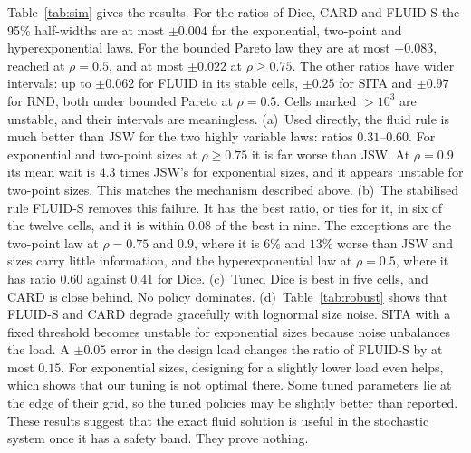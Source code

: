 Table~\ref{tab:sim} gives the results. For the ratios of Dice, CARD and FLUID-S the 95\% half-widths are at most $\pm0.004$ for the exponential, two-point and hyperexponential laws. For the bounded Pareto law they are at most $\pm0.083$, reached at $\rho=0.5$, and at most $\pm0.022$ at $\rho\ge0.75$. The other ratios have wider intervals: up to $\pm0.062$ for FLUID in its stable cells, $\pm0.25$ for SITA and $\pm0.97$ for RND, both under bounded Pareto at $\rho=0.5$. Cells marked $>10^3$ are unstable, and their intervals are meaningless.
(a)~Used directly, the fluid rule is much better than JSW for the two highly variable laws: ratios $0.31$--$0.60$. For exponential and two-point sizes at $\rho\ge0.75$ it is far worse than JSW. At $\rho=0.9$ its mean wait is $4.3$ times JSW's for exponential sizes, and it appears unstable for two-point sizes. This matches the mechanism described above.
(b)~The stabilised rule FLUID-S removes this failure. It has the best ratio, or ties for it, in six of the twelve cells, and it is within $0.08$ of the best in nine. The exceptions are the two-point law at $\rho=0.75$ and $0.9$, where it is $6\%$ and $13\%$ worse than JSW and sizes carry little information, and the hyperexponential law at $\rho=0.5$, where it has ratio $0.60$ against $0.41$ for Dice.
(c)~Tuned Dice is best in five cells, and CARD is close behind. No policy dominates.
(d)~Table~\ref{tab:robust} shows that FLUID-S and CARD degrade gracefully with lognormal size noise. SITA with a fixed threshold becomes unstable for exponential sizes because noise unbalances the load. A $\pm0.05$ error in the design load changes the ratio of FLUID-S by at most $0.15$. For exponential sizes, designing for a slightly lower load even helps, which shows that our tuning is not optimal there.
Some tuned parameters lie at the edge of their grid, so the tuned policies may be slightly better than reported. These results suggest that the exact fluid solution is useful in the stochastic system once it has a safety band. They prove nothing.

